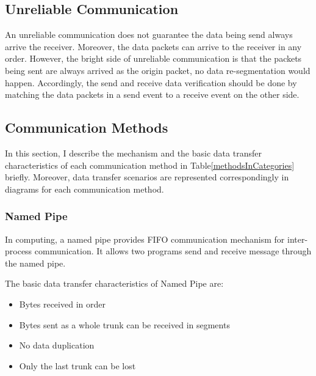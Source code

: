 \subsection{Unreliable Communication}\label{unreliable}
An unreliable communication does not guarantee the data being send always arrive the receiver. Moreover, the data packets can arrive to the receiver in any order. However, the bright side of unreliable communication is that the packets being sent are always arrived as the origin packet, no data re-segmentation would happen. Accordingly, the send and receive data verification should be done by matching the data packets in a send event to a receive event on the other side.

\subsection{Communication Methods}
In this section, I describe the mechanism and the basic data transfer characteristics of each communication method in Table\ref{methodsInCategories} briefly. Moreover, data transfer scenarios are represented correspondingly in diagrams for each communication method. 
 
\subsubsection{Named Pipe}
In computing, a named pipe provides FIFO communication mechanism for inter-process communication. It allows two programs send and receive message through the named pipe.

The basic data transfer characteristics of Named Pipe are:
\begin{itemize}
  \item Bytes received in order
  \item Bytes sent as a whole trunk can be received in segments
  \item No data duplication
  \item Only the last trunk can be lost
\end{itemize}

